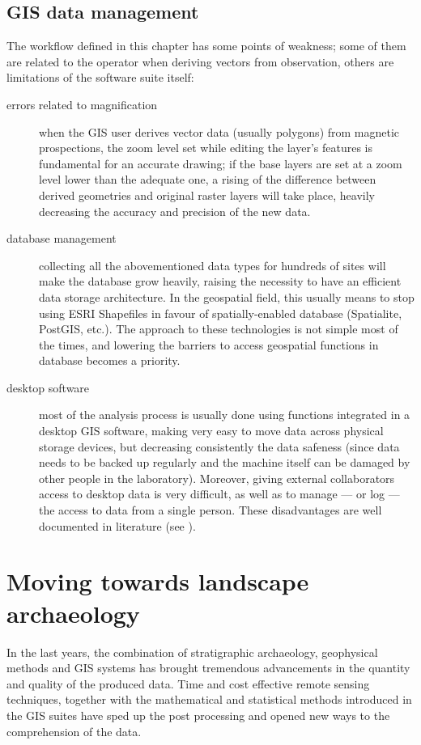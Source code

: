         \subsection{GIS data management\label{sec:gis-data-management}}
            The workflow defined in this chapter has some points of weakness; some of them are related to the operator when deriving vectors from observation, others are limitations of the software suite itself:
            \begin{description}
                \item[errors related to magnification] when the GIS user derives vector data (usually polygons) from magnetic prospections, the zoom level set while editing the layer's features is fundamental for an accurate drawing; if the base layers are set at a zoom level lower than the adequate one, a rising of the difference between derived geometries and original raster layers will take place, heavily decreasing the accuracy and precision of the new data.
                \item[database management] collecting all the abovementioned data types for hundreds of sites will make the database grow heavily, raising the necessity to have an efficient data storage architecture. In the geospatial field, this usually means to stop using ESRI Shapefiles in favour of spatially-enabled database (Spatialite, PostGIS, etc.). The approach to these technologies is not simple most of the times, and lowering the barriers to access geospatial functions in database becomes a priority.
                \item[desktop software] most of the analysis process is usually done using functions integrated in a desktop GIS software, making very easy to move data across physical storage devices, but decreasing consistently the data safeness (since data needs to be backed up regularly and the machine itself can be damaged by other people in the laboratory). Moreover, giving external collaborators access to desktop data is very difficult, as well as to manage --- or log --- the access to data from a single person. These disadvantages are well documented in literature (see \cite[p.~19]{fronza-informatica}).
            \end{description}

    \section{Moving towards landscape archaeology}
        In the last years, the combination of stratigraphic archaeology, geophysical methods and GIS systems has brought tremendous advancements in the quantity and quality of the produced data. Time and cost effective remote sensing techniques, together with the mathematical and statistical methods introduced in the GIS suites have sped up the post processing and opened new ways to the comprehension of the data.

